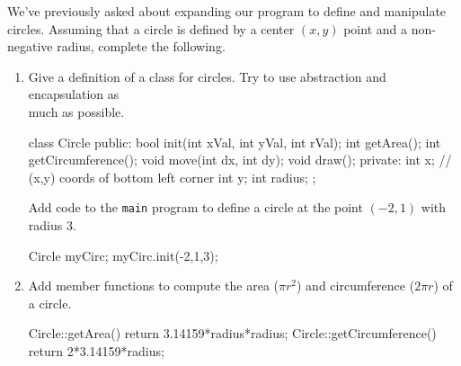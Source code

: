   \Q We've previously asked about expanding our program to define and manipulate
    circles.  Assuming that a circle is defined by a center $(x,y)$ point and a non-negative 
    radius, complete the following.
    \begin{enumerate}
      \item Give a definition of a class for circles.  Try to use abstraction and
        encapsulation as\key\\[-2.5mm] much as possible.
        \begin{answer}[1.75in]
          \begin{center}
            \small
            \begin{minipage}{4in}
              \begin{cpplst}
class Circle {
  public:
    bool init(int xVal, int yVal, int rVal);
    int getArea();
    int getCircumference();
    void move(int dx, int dy);
    void draw();
  private:
    int x;       // (x,y) coords of bottom left corner
    int y;
    int radius; 
};
              \end{cpplst}
            \end{minipage}
          \end{center}
        \end{answer}

  \Q Add code to the {\tt main} program to define a circle at the point $(-2,1)$
    with radius 3.
    \begin{answer}[1.25in]
      \begin{center}
        \small
        \begin{minipage}{4in}
          \begin{cpplst}
Circle myCirc;
myCirc.init(-2,1,3);
          \end{cpplst}
        \end{minipage}
      \end{center}
    \end{answer}

      \item Add member functions to compute the area ($\pi r^2$) and circumference
        ($2\pi r$) of a circle.
        \begin{answer}[1.25in]
          \begin{center}
            \small
            \begin{minipage}{4in}
              \begin{cpplst}
Circle::getArea() { return 3.14159*radius*radius; }
Circle::getCircumference() { return 2*3.14159*radius; }
              \end{cpplst}
            \end{minipage}
          \end{center}
        \end{answer}


\end{enumerate}
